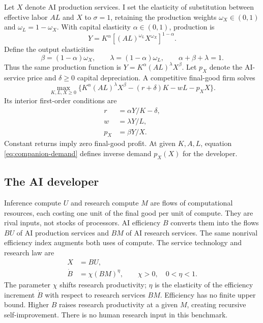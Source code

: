 Let $X$ denote AI production services. I set the elasticity of substitution
between effective labor $AL$ and $X$ to $\sigma=1$, retaining the production
weights $\omega_X\in(0,1)$ and $\omega_L=1-\omega_X$. With capital elasticity
$\alpha\in(0,1)$, production is
\begin{equation}
 Y=K^\alpha\left[(AL)^{\omega_L}X^{\omega_X}\right]^{1-\alpha}.
 \label{eq:companion-production-original}
\end{equation}
Define the output elasticities
\begin{equation}
 \beta=(1-\alpha)\omega_X,\qquad
 \lambda=(1-\alpha)\omega_L,\qquad\alpha+\beta+\lambda=1.
 \label{eq:companion-elasticities}
\end{equation}
Thus the same production function is $Y=K^\alpha(AL)^\lambda X^\beta$.
Let $p_X$ denote the AI-service price and $\delta\geq0$ capital depreciation.
A competitive final-good firm solves
\begin{equation}
 \max_{K,L,X\geq0}\{K^\alpha(AL)^\lambda X^\beta-(r+\delta)K-wL-p_XX\}.
 \label{eq:companion-firm}
\end{equation}
Its interior first-order conditions are
\begin{align}
 r&=\alpha Y/K-\delta,\label{eq:companion-rental}\\
 w&=\lambda Y/L,\label{eq:companion-wage}\\
 p_X&=\beta Y/X.\label{eq:companion-demand}
\end{align}
Constant returns imply zero final-good profit. At given $K,A,L$, equation
\eqref{eq:companion-demand} defines inverse demand $p_X(X)$ for the developer.

\subsection{The AI developer}

Inference compute $U$ and research compute $M$ are flows of computational
resources, each costing one unit of the final good per unit of compute.
They are rival inputs, not stocks of processors. AI efficiency $B$ converts
them into the flows $BU$ of AI production services and $BM$ of AI research
services. The same nonrival efficiency index augments both uses of compute.
The service technology and research law are
\begin{align}
 X&=BU,\label{eq:companion-services}\\
 \dot B&=\chi(BM)^\eta,\qquad\chi>0,\quad0<\eta<1.
 \label{eq:companion-research-law}
\end{align}
The parameter $\chi$ shifts research productivity; $\eta$ is the elasticity
of the efficiency increment $\dot B$ with respect to research services $BM$.
Efficiency has no finite upper bound. Higher $B$ raises research productivity
at a given $M$, creating recursive self-improvement. There is no human
research input in this benchmark.

